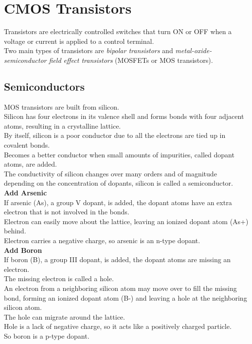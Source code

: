 \documentclass[12pt]{article}
\theoremstyle{definition}
\begin{document}
  \newpage

  \section{CMOS Transistors}
  Transistors are electrically controlled switches that turn ON or OFF when a voltage or current is applied to a control terminal. \\
  Two main types of transistors are \emph{bipolar transistors} and \emph{metal-oxide-semiconductor field effect transistors} (MOSFETs or MOS transistors).

  \subsection{Semiconductors}
  MOS transistors are built from silicon. \\
  Silicon has four electrons in its valence shell and forms bonds with four adjacent atoms, resulting in a crystalline lattice. \\
  By itself, silicon is a poor conductor due to all the electrons are tied up in covalent bonds. \\
  Becomes a better conductor when small amounts of impurities, called dopant atoms, are added. \\
  The conductivity of silicon changes over many orders and of magnitude depending on the concentration of dopants, silicon is called a semiconductor. \\
  \textbf{Add Arsenic} \\
  If arsenic (As), a group V dopant, is added, the dopant atoms have an extra electron that is not involved in the bonds. \\
  Electron can easily move about the lattice, leaving an ionized dopant atom (As+) behind. \\
  Electron carries a negative charge, so arsenic is an n-type dopant. \\
  \textbf{Add Boron} \\
  If boron (B), a group III dopant, is added, the dopant atoms are missing an electron. \\
  The missing electron is called a hole. \\
  An electron from a neighboring silicon atom may move over to fill the missing bond, forming an ionized dopant atom (B-) and leaving a hole at the neighboring silicon atom. \\
  The hole can migrate around the lattice. \\
  Hole is a lack of negative charge, so it acts like a positively charged particle. \\
  So boron is a p-type dopant.
\end{document}
